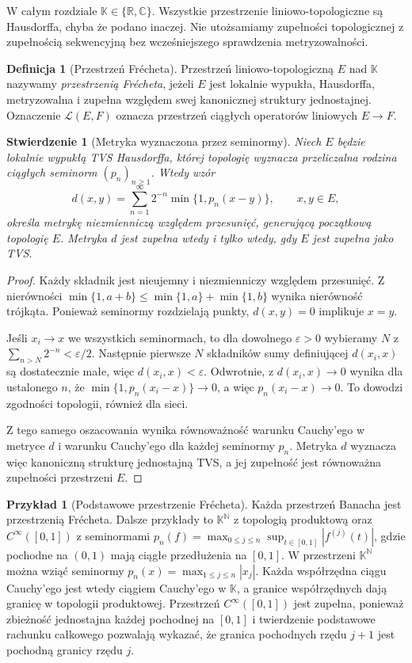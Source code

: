 \documentclass[11pt,a4paper]{article}
\numberwithin{equation}{section}
\theoremstyle{plain}
\newtheorem{stwierdzenie}[twierdzenie]{Stwierdzenie}
\theoremstyle{definition}
\newtheorem{definicja}[twierdzenie]{Definicja}
\newtheorem{przyklad}[twierdzenie]{Przykład}
\theoremstyle{remark}
\newcommand{\R}{\mathbb R}
\newcommand{\C}{\mathbb C}
\newcommand{\N}{\mathbb N}
\newcommand{\K}{\mathbb K}
\begin{document}
W całym rozdziale $\K\in\{\R,\C\}$. Wszystkie przestrzenie
liniowo-topologiczne są Hausdorffa, chyba że podano inaczej.
Nie utożsamiamy zupełności topologicznej z zupełnością sekwencyjną
bez wcześniejszego sprawdzenia metryzowalności.

\begin{definicja}[Przestrzeń Frécheta]\label{def:frechet11}
Przestrzeń liniowo-topologiczną $E$ nad $\K$ nazywamy
\emph{przestrzenią Frécheta}, jeżeli $E$ jest lokalnie wypukła,
Hausdorffa, metryzowalna i zupełna względem swej kanonicznej
struktury jednostajnej. Oznaczenie $\mathcal L(E,F)$ oznacza
przestrzeń ciągłych operatorów liniowych $E\to F$.
\end{definicja}

\begin{stwierdzenie}[Metryka wyznaczona przez seminormy]\label{prop:frechet-metric11}
Niech $E$ będzie lokalnie wypukłą TVS Hausdorffa, której topologię
wyznacza przeliczalna rodzina ciągłych seminorm $(p_n)_{n\ge1}$.
Wtedy wzór
\[
 d(x,y)=\sum_{n=1}^{\infty}2^{-n}\min\{1,p_n(x-y)\},\qquad x,y\in E,
\]
określa metrykę niezmienniczą względem przesunięć, generującą
początkową topologię $E$. Metryka $d$ jest zupełna wtedy i tylko
wtedy, gdy $E$ jest zupełna jako TVS.
\end{stwierdzenie}
\begin{proof}
Każdy składnik jest nieujemny i niezmienniczy względem przesunięć.
Z nierówności $\min\{1,a+b\}\le \min\{1,a\}+\min\{1,b\}$
wynika nierówność trójkąta. Ponieważ seminormy rozdzielają punkty,
$d(x,y)=0$ implikuje $x=y$.

Jeśli $x_i\to x$ we wszystkich seminormach, to dla dowolnego
$\varepsilon>0$ wybieramy $N$ z $\sum_{n>N}2^{-n}<\varepsilon/2$.
Następnie pierwsze $N$ składników sumy definiującej $d(x_i,x)$
są dostatecznie małe, więc $d(x_i,x)<\varepsilon$.
Odwrotnie, z $d(x_i,x)\to0$ wynika dla ustalonego $n$,
że $\min\{1,p_n(x_i-x)\}\to0$, a więc $p_n(x_i-x)\to0$.
To dowodzi zgodności topologii, również dla sieci.

Z tego samego oszacowania wynika równoważność warunku Cauchy'ego
w metryce $d$ i warunku Cauchy'ego dla każdej seminormy $p_n$.
Metryka $d$ wyznacza więc kanoniczną strukturę jednostajną TVS,
a jej zupełność jest równoważna zupełności przestrzeni $E$.
\end{proof}

\begin{przyklad}[Podstawowe przestrzenie Frécheta]\label{ex:frechet-list11}
Każda przestrzeń Banacha jest przestrzenią Frécheta. Dalsze
przykłady to $\K^{\N}$ z topologią produktową oraz
$C^\infty([0,1])$ z seminormami
$p_n(f)=\max_{0\le j\le n}\sup_{t\in[0,1]}|f^{(j)}(t)|$,
gdzie pochodne na $(0,1)$ mają ciągłe przedłużenia na $[0,1]$.
W przestrzeni $\K^{\N}$ można wziąć seminormy
$p_n(x)=\max_{1\le j\le n}|x_j|$. Każda współrzędna ciągu
Cauchy'ego jest wtedy ciągiem Cauchy'ego w $\K$, a granice
współrzędnych dają granicę w topologii produktowej.
Przestrzeń $C^\infty([0,1])$ jest zupełna, ponieważ zbieżność
jednostajna każdej pochodnej na $[0,1]$ i twierdzenie podstawowe
rachunku całkowego pozwalają wykazać, że granica pochodnych
rzędu $j+1$ jest pochodną granicy rzędu $j$.
\end{przyklad}
\end{document}
